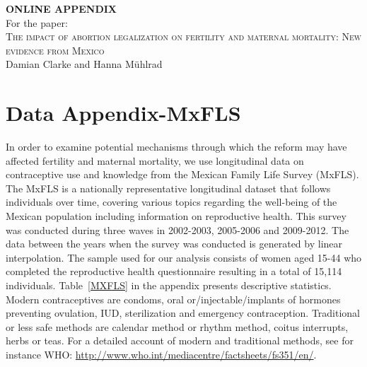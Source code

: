 \documentclass[a4paper, 11pt]{article}
\begin{document}
\begin{spacing}{1.4}
  \begin{center}
    \textbf{ONLINE APPENDIX} \\
    \vspace{4mm}
    For the paper: \\
    \vspace{6mm}
           {\large \textsc{The impact of abortion legalization on fertility and maternal
               mortality: New evidence from Mexico}} \\
    \vspace{3mm}
    Damian Clarke and Hanna M\"uhlrad
\end{center}

\tableofcontents
\setlength\parindent{0.25in}
\setlength\parskip{0.25in}

\newpage

\section{Data Appendix-MxFLS}\label{mxfls}
 
 
 In order to examine potential mechanisms through which the reform may have affected fertility and maternal mortality, we use longitudinal data on contraceptive use and knowledge from the Mexican Family Life Survey (MxFLS). The MxFLS is a nationally representative longitudinal dataset that follows individuals over time, covering various topics regarding the well-being of the Mexican population including information on reproductive health. This survey was conducted during three waves in 2002-2003, 2005-2006 and 2009-2012. The data between the years when the survey was conducted is generated by linear interpolation. The sample used for our analysis consists of women aged 15-44 who completed the reproductive health questionnaire resulting in a total of 15,114 individuals. Table~\ref{MXFLS} in the appendix presents descriptive statistics. Modern contraceptives are condoms, oral or/injectable/implants of hormones preventing ovulation, IUD, sterilization and emergency contraception. Traditional or less safe methods are calendar method or rhythm method, coitus interrupts, herbs or teas. For a detailed account of modern and traditional methods, see for instance WHO: \url{http://www.who.int/mediacentre/factsheets/fs351/en/}.
 
 
 
 

\end{spacing}
\end{document}
